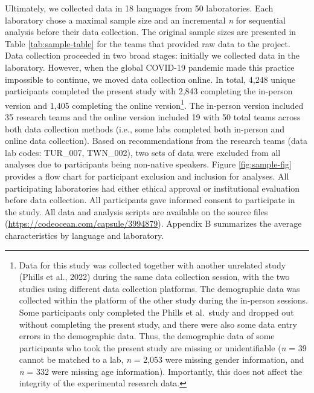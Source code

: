 \documentclass[
  man,floatsintext]{apa7}
\begin{document}
Ultimately, we collected data in 18
languages from 50
laboratories. Each laboratory chose a maximal sample size and an
incremental \emph{n} for sequential analysis before their data collection.
The original sample sizes are presented in Table \ref{tab:sample-table}
for the teams that provided raw data to the project. Data collection
proceeded in two broad stages: initially we collected data in the
laboratory. However, when the global COVID-19 pandemic made this
practice impossible to continue, we moved data collection online. In
total,
4,248
unique participants completed the present study with
2,843
completing the in-person version and
1,405
completing the online version\footnote{Data for this study was collected together with another unrelated
  study (Phills et al., 2022) during the same data collection
  session, with the two studies using different data collection
  platforms. The demographic data was collected within the platform of
  the other study during the in-person sessions. Some participants
  only completed the Phills et al.~study and dropped out without
  completing the present study, and there were also some data entry
  errors in the demographic data. Thus, the demographic data of some
  participants who took the present study are missing or
  unidentifiable (\emph{n} =
  39
  cannot be matched to a lab, \emph{n} =
  2,053
  were missing gender information, and \emph{n} =
  332 were missing age
  information). Importantly, this does not affect the integrity of the
  experimental research data.}. The in-person version included
35
research teams and the online version included
19
with 50 total teams across both data
collection methods (i.e., some labs completed both in-person and online
data collection). Based on recommendations from the research teams (data
lab codes: TUR\_007, TWN\_002), two sets of data were excluded from all
analyses due to participants being non-native speakers. Figure
\ref{fig:sample-fig} provides a flow chart for participant exclusion
and inclusion for analyses. All participating laboratories had either
ethical approval or institutional evaluation before data collection. All participants gave informed consent to participate in the study. All
data and analysis scripts are available on the source files
(\url{https://codeocean.com/capsule/3994879}). Appendix B summarizes the
average characteristics by language and laboratory.
\end{document}
